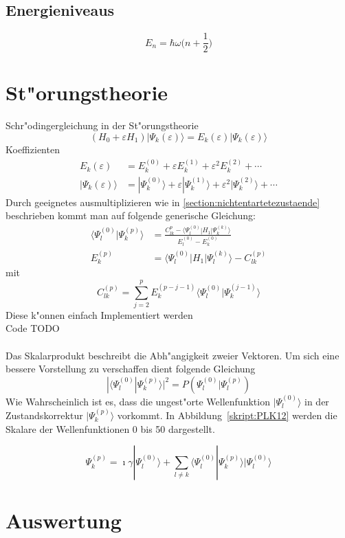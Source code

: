\begin{refsection}
\subsection{Energieniveaus}
\[
E_n
=
\hbar\omega\biggl(n+\frac12\biggr)
\]

\section{St"orungstheorie}
Schr"odingergleichung in der St"orungstheorie
\[
(H_0+\varepsilon H_1)|\Psi_k(\varepsilon)\rangle
=
E_k(\varepsilon)|\Psi_k(\varepsilon)\rangle
\]
Koeffizienten
\begin{align*}
E_k(\varepsilon)
&=
E_k^{(0)}+\varepsilon E_k^{(1)}+\varepsilon^2 E_k^{(2)}+\dotsb
\\
|\Psi_k(\varepsilon)\rangle
&=
|\Psi_k^{(0)}\rangle+\varepsilon|\Psi_k^{(1)}\rangle+
\varepsilon^2|\Psi_k^{(2)}\rangle+\dotsb
\end{align*}
Durch geeignetes ausmultiplizieren wie in \ref{section:nichtentartetezustaende}  beschrieben kommt man auf folgende generische Gleichung:
\begin{align*}
\langle\Psi_l^{(0)}|\Psi_k^{(p)}\rangle
&=
\frac{C_{lk}^{p}-\langle\Psi_l^{(0)}|H_1|\Psi_k^{(k)}\rangle}
{E_l^{(0)}-E_k^{(0)}}
\\
E_k^{(p)}
&=
\langle\Psi_l^{(0)}|H_1|\Psi_l^{(k)}\rangle-C_{lk}^{(p)}
\end{align*}
mit
\[
C_{lk}^{(p)}
=
\displaystyle\sum_{j=2}^{p} E_k^{(p-j-1)}
\langle\Psi_l^{(0)}|\Psi_k^{(j-1)}\rangle
\]
Diese k"onnen einfach Implementiert werden\\
Code TODO\\
\\
Das Skalarprodukt beschreibt die Abh"angigkeit zweier Vektoren. Um sich eine bessere Vorstellung zu verschaffen dient folgende Gleichung
\[
|\langle\Psi_l^{(0)}|\Psi_k^{(p)}\rangle|^2
=
P(\Psi_l^{(0)}|\Psi_l^{(p)})
\]
Wie Wahrscheinlich ist es, dass die ungest"orte Wellenfunktion $|\Psi_l^{(0)}\rangle$ in der Zustandskorrektur $|\Psi_k^{(p)}\rangle$ vorkommt. In Abbildung~\ref{skript:PLK12} werden die Skalare der Wellenfunktionen 0 bis 50 dargestellt.

\[
\Psi_k^{(p)}
=
\imath\gamma|\Psi_l^{(0)}\rangle+
\displaystyle\sum_{l\neq k} \langle\Psi_l^{(0)}|\Psi_k^{(p)}\rangle
|\Psi_l^{(0)}\rangle
\]
\section{Auswertung}


\end{refsection}

